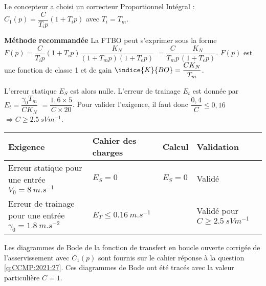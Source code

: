 Le concepteur a choisi un correcteur Proportionnel Intégral :	$C_1 (p)=\dfrac{C}{T_i p} \left(1+T_i p\right)$ avec $T_i=T_m$.

\ifprof
\begin{corrige}
\textbf{Méthode recommandée}
La FTBO peut s'exprimer sous la forme $F(p)=\dfrac{C}{T_i p} \left(1+T_i p\right)\dfrac{K_N}{\left(1+T_m p\right) \left(1+T_e p\right)}$ $=\dfrac{C}{T_m p}\dfrac{K_N}{ \left(1+T_e p\right)}$. $F(p)$ est une fonction de classe 1 et de gain $\indice{K}{BO} = \dfrac{CK_N}{T_m} $.

L'erreur statique $E_S$ est alors nulle. L'erreur de trainage $E_t$ est donnée par  $E_t = \dfrac{\gamma_0 T_m}{C K_N}$ $ =\dfrac{1,6\times 5}{C \times 20}$. Pour valider l'exigence, il faut donc $\dfrac{0,4}{C} \leq 0,16 $
$\Rightarrow C\geq  \SI{2,5}{sVm^{-1}}$.

\begin{center}
\begin{tabular}{p{5cm}llp{3cm}}
\hline
Exigence & Cahier des charges & Calcul & Validation  \\
\hline
Erreur statique pour une entrée $V_0 = \SI{8}{m.s^{-1}}$ & $E_S=0$ & $E_S=0$ & Validé \\
Erreur de trainage pour une entrée $\gamma_0 = \SI{1,8}{m.s^{-2}}$ & $E_T\leq \SI{0,16}{m.s^{-1}}$ &  & Validé pour  $C\geq  \SI{2,5}{sVm^{-1}}$\\
\hline
\end{tabular}
\end{center} 
\end{corrige}
\else
\fi

Les diagrammes de Bode de la fonction de transfert en boucle ouverte corrigée de l'asservissement avec $C_1 (p)$ sont fournis sur le cahier réponse à la question \ref{q:CCMP:2021:27}. Ces diagrammes de Bode ont été tracés avec la valeur particulière $C=1$.

\ifprof
\begin{corrige}
\end{corrige}
\else
\fi

